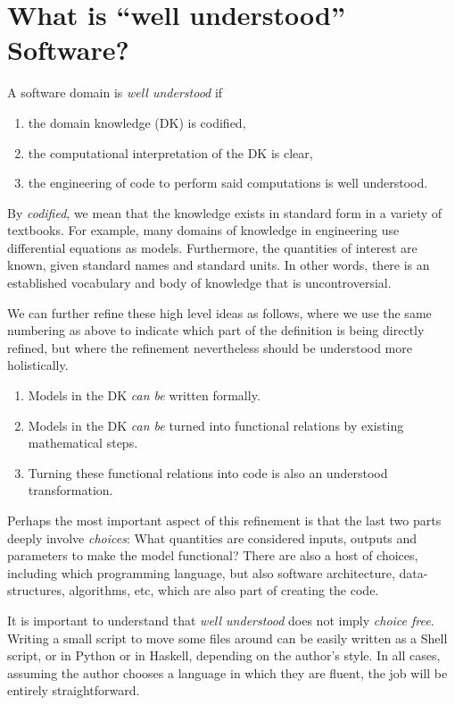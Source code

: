\documentclass[sigconf,review]{acmart}
\begin{document}
\section{What is ``well understood'' Software?}\label{ch:wellUnderstood}

\begin{defn}
A software domain is \emph{well understood} if
\begin{enumerate}
\item the domain knowledge (DK) is codified,
\item the computational interpretation of the DK is clear,
\item the engineering of code to perform said computations is well
understood.
\end{enumerate}
\end{defn}

By \emph{codified}, we mean that the knowledge exists in standard form in
a variety of textbooks. For example, many domains of knowledge in engineering
use differential equations as models. Furthermore, the quantities of interest
are known, given standard names and standard units. In other words, there is
an established vocabulary and body of knowledge that is uncontroversial.

We can further refine these high level ideas as follows, where we use
the same numbering as above to indicate which part of the definition is
being directly refined, but where the refinement nevertheless should be
understood more holistically.
\begin{enumerate}
\item Models in the DK \emph{can be} written formally.
\item Models in the DK \emph{can be} turned into functional relations by
 existing mathematical steps.
\item Turning these functional relations into code is also an understood
 transformation.
\end{enumerate}
Perhaps the most important aspect of this refinement is that the last two
parts deeply involve \emph{choices}: What quantities are considered inputs,
outputs and parameters to make the model functional? There are also a host
of choices, including which programming language, but also software
architecture, data-structures, algorithms, etc, which are also part of
creating the code.

It is important to understand that \emph{well understood} does not imply
\emph{choice free}.  Writing a small script to move some files around can
be easily written as a Shell script, or in Python or in Haskell, depending on
the author's style. In all cases, assuming the author chooses a language
in which they are fluent, the job will be entirely straightforward.
\end{document}
